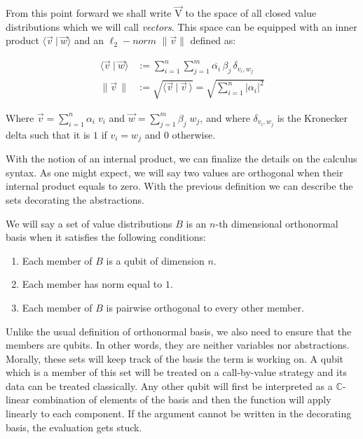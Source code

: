 \documentclass[runningheads,orivec]{llncs}
\newcommand\s[1]{\ensuremath{\mathsf{#1}}}
\newcommand\Val{{\s V}}
\def\C{\mathbb{C}}            %
\def\Val{\mathrm{V}}          %
\def\scal#1#2{\langle{#1}~|~{#2}\rangle}
\begin{document}
From this point forward we shall write $\vec{\Val}$ to the space of all closed value distributions which we will call \emph{vectors}. This space can be equipped with an inner product $\scal{\vec v}{\vec w}$ and an $\ell_2-norm$ $\|\vec v\|$ defined as:

\begin{align*}
  \textstyle\scal{\vec{v}}{\vec{w}}&:=\textstyle\sum_{i=1}^n\sum_{j=1}^m\overline{\alpha_i}\,\beta_j\,\delta_{v_i,w_j}\\
  \textstyle\|\vec{v}\,\|&:=\textstyle\sqrt{\scal{\vec{v}}{\vec{v}\,}}=\textstyle\sqrt{\sum_{i=1}^n|\alpha_i|^2}    
\end{align*}

Where $\vec{v}=\sum_{i=1}^n\alpha_i\; v_i$ and $\vec{w}=\sum_{j=1}^m\beta_j\; w_j$, and where $\delta_{v_i,w_j}$ is the Kronecker delta such that it is $1$ if $v_i=w_j$ and $0$ otherwise.

With the notion of an internal product, we can finalize the details on the calculus syntax. As one might expect, we will say two values are orthogonal when their internal product equals to zero. With the previous definition we can describe the sets decorating the abstractions.

\begin{definition}\label{def:NthDimensionalBasis}
We will say a set of value distributions $B$ is an $n$-th dimensional orthonormal basis when it satisfies the following conditions:
\begin{enumerate}
  \item Each member of $B$ is a qubit of dimension $n$.
  \item Each member has norm equal to $1$.
  \item Each member of $B$ is pairwise orthogonal to every other member. 
\end{enumerate}
\end{definition}

Unlike the usual definition of orthonormal basis, we also need to ensure that the members are qubits. In other words, they are neither variables nor abstractions. Morally, these sets will keep track of the basis the term is working on. A qubit which is a member of this set will be treated on a call-by-value strategy and its data can be treated classically. Any other qubit will first be interpreted as a $\C$-linear combination of elements of the basis and then the function will apply linearly to each component. If the argument cannot be written in the decorating basis, the evaluation gets stuck. 
\end{document}
